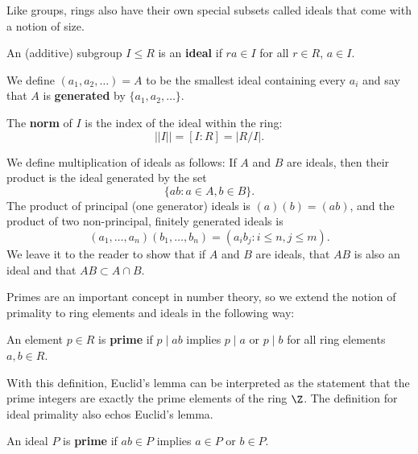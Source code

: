 Like groups, rings also have their own special subsets called ideals that come with a notion of size.

\begin{definition}[Ideal]
    An (additive) subgroup $I \leq R$ is an \textbf{ideal} if $ra \in I$ for all $r \in R$, $a \in I$.

    We define $(a_1, a_2, \ldots) = A$ to be the smallest ideal containing every $a_i$ and say that $A$ is \textbf{generated} by $\{a_1, a_2, \ldots \}$.
\end{definition}

\begin{definition}
    The \textbf{norm} of $I$ is the index of the ideal within the ring:
    \begin{equation}
        ||I|| = [I : R] = |R / I|.
    \end{equation}
\end{definition}

We define multiplication of ideals as follows: If $A$ and $B$ are ideals, then their product is the ideal generated by the set
\begin{equation}
    \{ ab : a \in A, b \in B \}.
\end{equation}
The product of principal (one generator) ideals is $(a) (b) = (ab)$, and the product of two non-principal, finitely generated ideals is
\begin{equation}
    (a_1, \ldots, a_n)(b_1, \ldots, b_n) = (a_i b_j : i \leq n, j \leq m).
\end{equation}
We leave it to the reader to show that if $A$ and $B$ are ideals, that $AB$ is also an ideal and that $AB \subset A \cap B$.

Primes are an important concept in number theory, so we extend the notion of primality to ring elements and ideals in the following way:

\begin{definition}
    \label{def:prime-element}
    An element $p \in R$ is \textbf{prime} if $p \mid ab$ implies $p \mid a$ or $p \mid b$ for all ring elements $a, b \in R$.
\end{definition}

With this definition, Euclid's lemma can be interpreted as the statement that the prime integers are exactly the prime elements of the ring $\Z$. The definition for ideal primality also echos Euclid's lemma.

\begin{definition}
    An ideal $P$ is \textbf{prime} if $ab \in P$ implies $a \in P$ or $b \in P$.
\end{definition}

